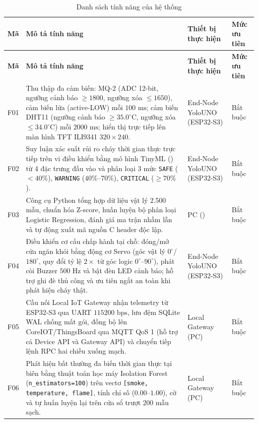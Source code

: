 {\small
\setlength{\tabcolsep}{4pt}
\renewcommand{\arraystretch}{1.22}
\begin{longtable}{|C{0.07\textwidth}|L{0.51\textwidth}|L{0.22\textwidth}|C{0.11\textwidth}|}
  \caption{Danh sách tính năng của hệ thống}
  \label{tab:danh-sach-tinh-nang} \\
  \hline
  \textbf{Mã} & \textbf{Mô tả tính năng} & \textbf{Thiết bị thực hiện} & \textbf{Mức ưu tiên} \\
  \hline
  \endfirsthead
  \hline
  \textbf{Mã} & \textbf{Mô tả tính năng} & \textbf{Thiết bị thực hiện} & \textbf{Mức ưu tiên} \\
  \hline
  \endhead
  \hline
  \endfoot
  F01 & Thu thập đa cảm biến: MQ-2 (ADC 12-bit, ngưỡng cảnh báo $\ge 1800$, ngưỡng xóa $\le 1650$), cảm biến lửa (active-LOW) mỗi $100\text{ ms}$; cảm biến DHT11 (ngưỡng cảnh báo $\ge 35.0^\circ\text{C}$, ngưỡng xóa $\le 34.0^\circ\text{C}$) mỗi $2000\text{ ms}$; hiển thị trực tiếp lên màn hình TFT ILI9341 $320 \times 240$. & End-Node YoloUNO (ESP32-S3) & Bắt buộc \\
  \hline
  F02 & Suy luận xác suất rủi ro cháy thời gian thực trực tiếp trên vi điều khiển bằng mô hình TinyML () từ 4 đặc trưng đầu vào và phân loại 3 mức \texttt{SAFE} ($< 40\%$), \texttt{WARNING} ($40\%$--$70\%$), \texttt{CRITICAL} ($\ge 70\%$). & End-Node YoloUNO (ESP32-S3) & Bắt buộc \\
  \hline
  F03 & Công cụ Python tổng hợp dữ liệu vật lý 2.500 mẫu, chuẩn hóa Z-score, huấn luyện bộ phân loại Logistic Regression, đánh giá ma trận nhầm lẫn và tự động xuất mã nguồn C header độc lập. & PC () & Bắt buộc \\
  \hline
  F04 & Điều khiển cơ cấu chấp hành tại chỗ: đóng/mở cửa ngăn khói bằng động cơ Servo (góc vật lý $0^\circ$/$180^\circ$, quy đổi tỷ lệ $2\times$ từ góc logic $0^\circ$--$90^\circ$), phát còi Buzzer $500\text{ Hz}$ và bật đèn LED cảnh báo; hỗ trợ ghi đè thủ công và ưu tiên ngắt an toàn khi phát hiện cháy thật. & End-Node YoloUNO (ESP32-S3) & Bắt buộc \\
  \hline
  F05 & Cầu nối Local IoT Gateway nhận telemetry từ ESP32-S3 qua UART $115200\text{ bps}$, lưu đệm SQLite WAL chống mất gói, đồng bộ lên CoreIOT/ThingsBoard qua MQTT QoS 1 (hỗ trợ cả Device API và Gateway API) và chuyển tiếp lệnh RPC hai chiều xuống mạch. & Local Gateway (PC) & Bắt buộc \\
  \hline
  F06 & Phát hiện bất thường đa biến thời gian thực tại biên bằng thuật toán học máy Isolation Forest (\texttt{n\_estimators=100}) trên vectơ \texttt{[smoke, temperature, flame]}, tính chỉ số  ($0.00$--$1.00$), cờ  và tự huấn luyện lại trên cửa sổ trượt 200 mẫu sạch. & Local Gateway (PC) & Bắt buộc \\

\end{longtable}}
